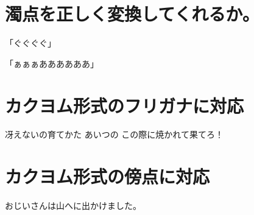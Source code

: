 \hypertarget{ux6fc1ux70b9ux3092ux6b63ux3057ux304fux5909ux63dbux3057ux3066ux304fux308cux308bux304b}{%
\section{濁点を正しく変換してくれるか。}\label{ux6fc1ux70b9ux3092ux6b63ux3057ux304fux5909ux63dbux3057ux3066ux304fux308cux308bux304b}}

「ぐぐぐぐ」

「ぁぁぁああああああ」

\hypertarget{ux30abux30afux30e8ux30e0ux5f62ux5f0fux306eux30d5ux30eaux30acux30caux306bux5bfeux5fdc}{%
\section{カクヨム形式のフリガナに対応}\label{ux30abux30afux30e8ux30e0ux5f62ux5f0fux306eux30d5ux30eaux30acux30caux306bux5bfeux5fdc}}

冴えないの育てかた
あいつの
この際に焼かれて果てろ！

\hypertarget{ux30abux30afux30e8ux30e0ux5f62ux5f0fux306eux508dux70b9ux306bux5bfeux5fdc}{%
\section{カクヨム形式の傍点に対応}\label{ux30abux30afux30e8ux30e0ux5f62ux5f0fux306eux508dux70b9ux306bux5bfeux5fdc}}

おじいさんは山へに出かけました。
